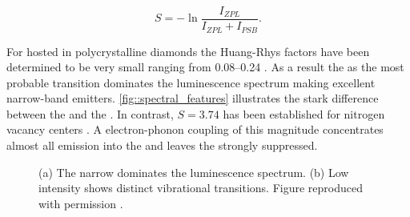    \begin{equation}
     S = -\ln{\frac{I_{ZPL}}{I_{ZPL} + I_{PSB}}}.
   \end{equation}

   For \sivs hosted in polycrystalline diamonds the Huang-Rhys factors have been determined to be very small ranging from \SIrange{0.08}{0.24}{} \cite{Duligall2006,Yuan2002,Nothaft2012}. As a result the \zpl as the most probable transition dominates the luminescence spectrum making \sivs excellent narrow-band emitters. \autoref{fig::spectral_features} illustrates the stark difference between the \zpl and the \psb. In contrast, $S=3.74$ has been established for nitrogen vacancy centers \cite{Davies1981}. A electron-phonon coupling of this magnitude concentrates almost all emission into the \psb and leaves the \zpl strongly suppressed.

   \begin{figure}[thbp]
 		\begin{subfigure}[t]{ 0.49\linewidth}
 			\centering
 			\caption{}
 		\end{subfigure}
 		\hfill
 		\begin{subfigure}[t]{ 0.49\linewidth}
 			\centering
 			\caption{}
 		\end{subfigure}
 		\caption[Fluorescence spectra of \sivs at room temperature]{(a) The narrow \zpl dominates the luminescence spectrum. (b) Low intensity \psb shows distinct vibrational transitions. Figure reproduced with permission \cite{Riedrich-moller2014}.}
 		\label{fig::spectral_features}
 	\end{figure}


